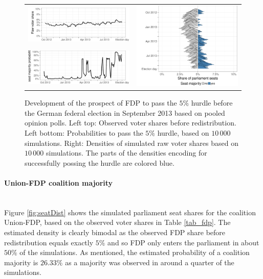 \documentclass[smallcondensed]{svjour3}     %
\begin{document}
\begin{figure}[H]\centering
\begin{tabular}{ll}
\includegraphics[height=.15\textwidth]{figures/2013_pooled_fdp_rawShares.pdf}
&
\multirow{2}{*}[13ex]{\includegraphics[height=30ex]{figures/2013_pooled_fdp_ridgeline.pdf}}
\\
\includegraphics[height=.15\textwidth]{figures/2013_pooled_fdp_passingProb.pdf}
\end{tabular}
\caption{Development of the prospect of FDP to pass the $5\%$ hurdle before the German federal election in September 2013 based on pooled opinion polls.
Left top: Observed voter shares before redistribution. Left bottom: Probabilities to pass the $5\%$ hurdle, based on $10\,000$ simulations. Right: Densities of simulated raw voter shares based on $10\,000$ simulations. The parts of the densities encoding for successfully possing the hurdle are colored blue.
\label{fig:2013_fdp}
}
\end{figure}


\paragraph{Union-FDP coalition majority} \ \\

Figure \ref{fig:seatDist} shows the simulated
parliament seat shares for the coalition Union-FDP, based on the observed
voter shares in Table \ref{tab_fdp}. The estimated density is clearly bimodal
as the observed FDP share before redistribution equals exactly $5\%$ and
so FDP only enters the parliament in about $50\%$ of the simulations. As mentioned,
the estimated probability of a coalition majority is $26.33\%$ as
a majority was observed in around a quarter of the simulations.
\end{document}

